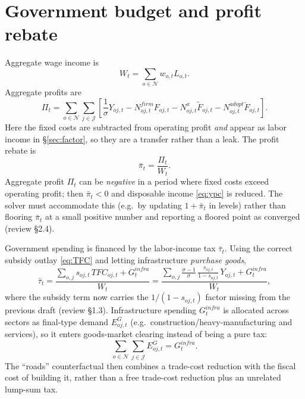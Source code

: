 \documentclass[11pt]{article}
\newcommand{\Nreg}{\mathcal{N}}
\newcommand{\Sct}{\mathcal{J}}
\begin{document}
\section{Government budget and profit rebate}\label{sec:gov}
Aggregate wage income is
\begin{equation}
  W_t = \sum_{o \in \Nreg} w_{o,t} L_{o,t}.
\end{equation}
Aggregate profits are
\begin{equation}
  \Pi_t
  =
  \sum_{o \in \Nreg} \sum_{j \in \Sct}
  \left[
    \frac{1}{\sigma} Y_{oj,t}
    - N^{firm}_{oj,t} F_{oj,t}
    - N^{x}_{oj,t} \tilde F_{oj,t}
    - N^{adopt}_{oj,t} \breve F_{oj,t}
  \right].
\end{equation}
Here the fixed costs are subtracted from operating profit \emph{and} appear as labor
income in \S\ref{sec:factor}, so they are a transfer rather than a leak. The profit rebate is
\begin{equation}
  \bar\pi_t = \frac{\Pi_t}{W_t}.
\end{equation}
Aggregate profit $\Pi_t$ can be \emph{negative} in a period where fixed costs exceed
operating profit; then $\bar\pi_t<0$ and disposable income \eqref{eq:ypc} is reduced. The
solver must accommodate this (e.g.\ by updating $1+\bar\pi_t$ in levels) rather than
flooring $\bar\pi_t$ at a small positive number and reporting a floored point as converged
(review \S2.4).

Government spending is financed by the labor-income tax $\bar\tau_t$. Using the correct
subsidy outlay \eqref{eq:TFC} and letting infrastructure \emph{purchase goods},
\begin{equation}
  \bar\tau_t
  =
  \frac{
    \displaystyle\sum_{o,j} s_{oj,t}\, TFC_{oj,t}
    + G^{infra}_t
  }{W_t}
  =
  \frac{
    \displaystyle\sum_{o,j} \frac{\sigma-1}{\sigma}\,\frac{s_{oj,t}}{1-s_{oj,t}}\, Y_{oj,t}
    + G^{infra}_t
  }{W_t},
\end{equation}
where the subsidy term now carries the $1/(1-s_{oj,t})$ factor missing from the previous
draft (review \S1.3). Infrastructure spending $G^{infra}_t$ is allocated across sectors as
final-type demand $E^{G}_{oj,t}$ (e.g.\ construction/heavy-manufacturing and services), so
it enters goods-market clearing instead of being a pure tax:
\begin{equation}
  \sum_{o\in\Nreg}\sum_{j\in\Sct} E^{G}_{oj,t} = G^{infra}_t .
\end{equation}
The ``roads'' counterfactual then combines a trade-cost reduction with the fiscal cost of
building it, rather than a free trade-cost reduction plus an unrelated lump-sum tax.
\end{document}
